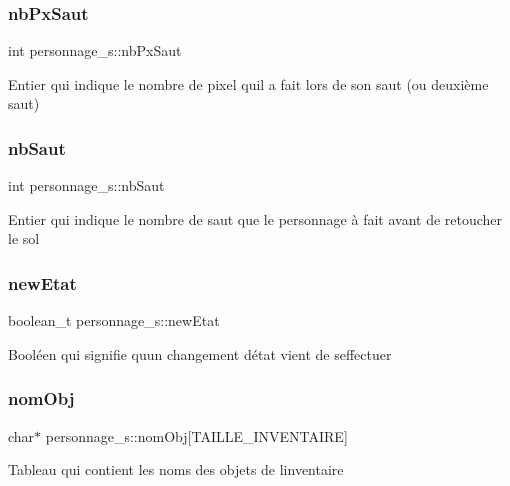 \subsubsection{\texorpdfstring{nb\+Px\+Saut}{nbPxSaut}}
{\footnotesize\ttfamily int personnage\+\_\+s\+::nb\+Px\+Saut}

Entier qui indique le nombre de pixel qu\textquotesingle{}il a fait lors de son saut (ou deuxième saut) \mbox{\label{structpersonnage__s_a1b5dac574e8ad57eaa9989699fbfb139}} 
\subsubsection{\texorpdfstring{nb\+Saut}{nbSaut}}
{\footnotesize\ttfamily int personnage\+\_\+s\+::nb\+Saut}

Entier qui indique le nombre de saut que le personnage à fait avant de retoucher le sol \mbox{\label{structpersonnage__s_ad9c2e07633c2a40855b169b4b677009f}} 
\subsubsection{\texorpdfstring{new\+Etat}{newEtat}}
{\footnotesize\ttfamily boolean\+\_\+t personnage\+\_\+s\+::new\+Etat}

Booléen qui signifie qu\textquotesingle{}un changement d\textquotesingle{}état vient de s\textquotesingle{}effectuer \mbox{\label{structpersonnage__s_a6fc3c82b6c4f407289aa55155876c867}} 
\subsubsection{\texorpdfstring{nom\+Obj}{nomObj}}
{\footnotesize\ttfamily char$\ast$ personnage\+\_\+s\+::nom\+Obj\mbox{[}T\+A\+I\+L\+L\+E\+\_\+\+I\+N\+V\+E\+N\+T\+A\+I\+RE\mbox{]}}

Tableau qui contient les noms des objets de l\textquotesingle{}inventaire \mbox{\label{structpersonnage__s_adea4789f8b55587ec092f3a32b7b1964}} 
